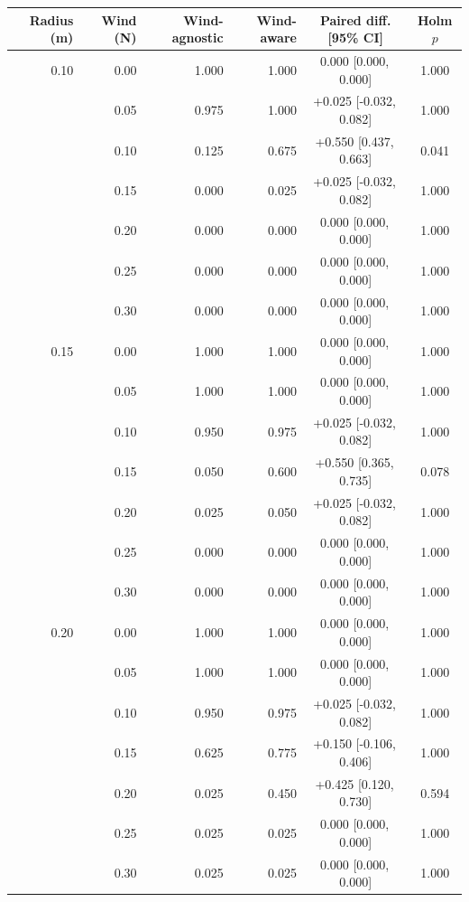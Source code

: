 \begin{tabular}{rrrrcc}
\toprule
Radius (m) & Wind (N) & Wind-agnostic & Wind-aware & Paired diff. [95\% CI] & Holm $p$ \\
\midrule
0.10 & 0.00 & 1.000 & 1.000 & 0.000 [0.000,\, 0.000] & 1.000 \\
 & 0.05 & 0.975 & 1.000 & +0.025 [-0.032,\, 0.082] & 1.000 \\
 & 0.10 & 0.125 & 0.675 & +0.550 [0.437,\, 0.663] & 0.041 \\
 & 0.15 & 0.000 & 0.025 & +0.025 [-0.032,\, 0.082] & 1.000 \\
 & 0.20 & 0.000 & 0.000 & 0.000 [0.000,\, 0.000] & 1.000 \\
 & 0.25 & 0.000 & 0.000 & 0.000 [0.000,\, 0.000] & 1.000 \\
 & 0.30 & 0.000 & 0.000 & 0.000 [0.000,\, 0.000] & 1.000 \\
0.15 & 0.00 & 1.000 & 1.000 & 0.000 [0.000,\, 0.000] & 1.000 \\
 & 0.05 & 1.000 & 1.000 & 0.000 [0.000,\, 0.000] & 1.000 \\
 & 0.10 & 0.950 & 0.975 & +0.025 [-0.032,\, 0.082] & 1.000 \\
 & 0.15 & 0.050 & 0.600 & +0.550 [0.365,\, 0.735] & 0.078 \\
 & 0.20 & 0.025 & 0.050 & +0.025 [-0.032,\, 0.082] & 1.000 \\
 & 0.25 & 0.000 & 0.000 & 0.000 [0.000,\, 0.000] & 1.000 \\
 & 0.30 & 0.000 & 0.000 & 0.000 [0.000,\, 0.000] & 1.000 \\
0.20 & 0.00 & 1.000 & 1.000 & 0.000 [0.000,\, 0.000] & 1.000 \\
 & 0.05 & 1.000 & 1.000 & 0.000 [0.000,\, 0.000] & 1.000 \\
 & 0.10 & 0.950 & 0.975 & +0.025 [-0.032,\, 0.082] & 1.000 \\
 & 0.15 & 0.625 & 0.775 & +0.150 [-0.106,\, 0.406] & 1.000 \\
 & 0.20 & 0.025 & 0.450 & +0.425 [0.120,\, 0.730] & 0.594 \\
 & 0.25 & 0.025 & 0.025 & 0.000 [0.000,\, 0.000] & 1.000 \\
 & 0.30 & 0.025 & 0.025 & 0.000 [0.000,\, 0.000] & 1.000 \\
\bottomrule
\end{tabular}
